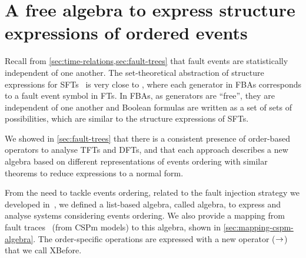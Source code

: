  \chapter{A free algebra to express structure expressions of ordered events}
\label{chap:algebra}



Recall from \cref{sec:time-relations,sec:fault-trees} that fault events are statistically independent of one another.
The set-theoretical abstraction of structure expressions for \acp{SFT}~\cite[pp. VI-11]{VGR+1981} is very close to , where each generator in \acp{FBA} corresponds to a fault event symbol in \aclp{FT}.
In \acp{FBA}, as generators are ``free'', they are independent of one another and Boolean formulas are written as a set of sets of possibilities, which are similar to the structure expressions of \acp{SFT}.

We showed in \cref{sec:fault-trees} that there is a consistent presence of order-based operators to analyse \acp{TFT} and \acp{DFT}, and that each approach describes a new algebra based on different representations of events ordering with similar theorems to reduce expressions to a normal form.

From the need to tackle events ordering, related to the fault injection strategy we developed in~\cite{DM2012}, we defined a list-based algebra, called \acf{algebra}, to express and analyse systems considering events ordering.
We also provide a mapping from fault traces~\cite{DM2012} (from \ac{CSPm} models) to this algebra, shown in \cref{sec:mapping-cspm-algebra}.
The order-specific operations are expressed with a new operator ($\rightarrow$) that we call \ac{XBefore}.

